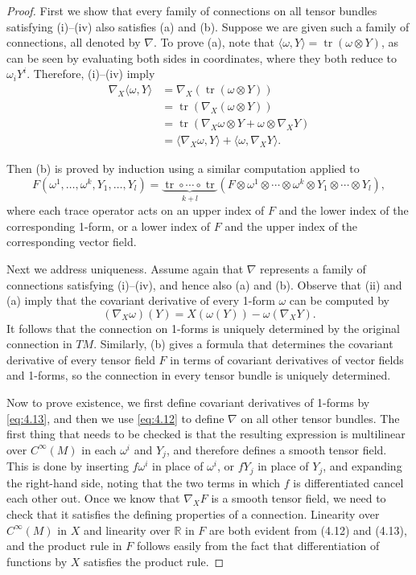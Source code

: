 \begin{proof}
First we show that every family of connections on all tensor bundles satisfying (i)--(iv) also satisfies (a) and (b). Suppose we are given such a family of connections, all denoted by $\nabla$. To prove (a), note that $\langle \omega, Y \rangle = \operatorname{tr}(\omega \otimes Y)$, as can be seen by evaluating both sides in coordinates, where they both reduce to $\omega_i Y^i$. Therefore, (i)--(iv) imply
\begin{align*}
  \nabla_X \langle \omega, Y \rangle &= \nabla_X (\operatorname{tr}(\omega \otimes Y)) \\
  &= \operatorname{tr}(\nabla_X(\omega \otimes Y)) \\
  &= \operatorname{tr}(\nabla_X\omega \otimes Y + \omega \otimes \nabla_X Y) \\
  &= \langle \nabla_X\omega, Y \rangle + \langle \omega, \nabla_X Y \rangle.
\end{align*}

Then (b) is proved by induction using a similar computation applied to
\[
  F(\omega^1,\ldots,\omega^k, Y_1,\ldots,Y_l) = \underbrace{\operatorname{tr}\circ\cdots\circ\operatorname{tr}}_{k+l}(F \otimes \omega^1 \otimes \cdots \otimes \omega^k \otimes Y_1 \otimes \cdots \otimes Y_l),
\]
where each trace operator acts on an upper index of $F$ and the lower index of the corresponding 1-form, or a lower index of $F$ and the upper index of the corresponding vector field.

Next we address uniqueness. Assume again that $\nabla$ represents a family of connections satisfying (i)--(iv), and hence also (a) and (b). Observe that (ii) and (a) imply that the covariant derivative of every 1-form $\omega$ can be computed by
\begin{equation}
  (\nabla_X\omega)(Y) = X(\omega(Y)) - \omega(\nabla_X Y). \label{eq:4.13}\tag{4.13}
\end{equation}
It follows that the connection on 1-forms is uniquely determined by the original connection in $TM$. Similarly, (b) gives a formula that determines the covariant derivative of every tensor field $F$ in terms of covariant derivatives of vector fields and 1-forms, so the connection in every tensor bundle is uniquely determined.

Now to prove existence, we first define covariant derivatives of 1-forms by \eqref{eq:4.13}, and then we use \eqref{eq:4.12} to define $\nabla$ on all other tensor bundles. The first thing that needs to be checked is that the resulting expression is multilinear over $C^\infty(M)$ in each $\omega^i$ and $Y_j$, and therefore defines a smooth tensor field. This is done by inserting $f\omega^i$ in place of $\omega^i$, or $fY_j$ in place of $Y_j$, and expanding the right-hand side, noting that the two terms in which $f$ is differentiated cancel each other out. Once we know that $\nabla_X F$ is a smooth tensor field, we need to check that it satisfies the defining properties of a connection. Linearity over $C^\infty(M)$ in $X$ and linearity over $\mathbb{R}$ in $F$ are both evident from (4.12) and (4.13), and the product rule in $F$ follows easily from the fact that differentiation of functions by $X$ satisfies the product rule.
\end{proof}

